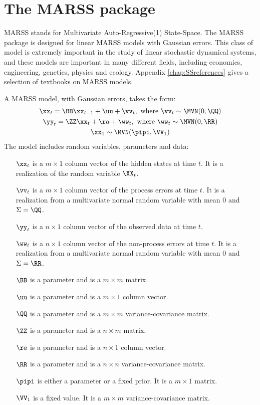 \chapter{The MARSS package}

MARSS stands for Multivariate Auto-Regressive(1) State-Space. The MARSS package is designed for linear MARSS models with Gaussian errors.  This class of model is extremely important in the study of linear stochastic dynamical systems, and these models are important in many different fields, including economics, engineering, genetics, physics and ecology.  Appendix \ref{chap:SSreferences} gives a selection of textbooks on MARSS models.   

A MARSS model, with Gaussian errors, takes the form:
\begin{subequations}\label{eqn:marss}
\begin{gather}
\xx_t = \BB\xx_{t-1} + \uu + \vv_t, \text{ where } \vv_t \sim \MVN(0,\QQ) \label{eqn:marssx}\\
\yy_t = \ZZ\xx_t + \aa + \ww_t, \text{ where } \ww_t \sim \MVN(0,\RR) \label{eqn:marssy}\\
\xx_1 \sim \MVN(\pipi,\VV_1) \label{eqn:marssx1}
\end{gather}
\end{subequations}
The model includes random variables, parameters and data:
\begin{itemize}
	\item[$\xx_t$] is a $m \times 1$ column vector of the hidden states at time $t$.  It is a realization of the random variable $\XX_t$.
	\item[$\vv_t$] is a $m \times 1$ column vector of the process errors at time $t$.  It is a realization from a multivariate normal random variable with mean 0 and $\Sigma=\QQ$.
	\item[$\yy_t$] is a $n \times 1$ column vector of the observed data at time $t$.
	\item[$\ww_t$] is a $n \times 1$ column vector of the non-process errors at time $t$.  It is a realization from a multivariate normal random variable with mean 0 and $\Sigma=\RR$.
	\item[$\BB$] is a parameter and is a $m \times m$ matrix.
	\item[$\uu$] is a parameter and is a $m \times 1$ column vector.
	\item[$\QQ$] is a parameter and is a $m \times m$ variance-covariance matrix.
	\item[$\ZZ$] is a parameter and is a $n \times m$ matrix.
	\item[$\aa$] is a parameter and is a $n \times 1$ column vector.
	\item[$\RR$] is a parameter and is a $n \times n$ variance-covariance matrix.
	\item[$\pipi$] is either a parameter or a fixed prior. It is a $m \times 1$ matrix.
	\item[$\VV_1$] is a fixed value. It is a $m \times m$ variance-covariance matrix.
\end{itemize}

